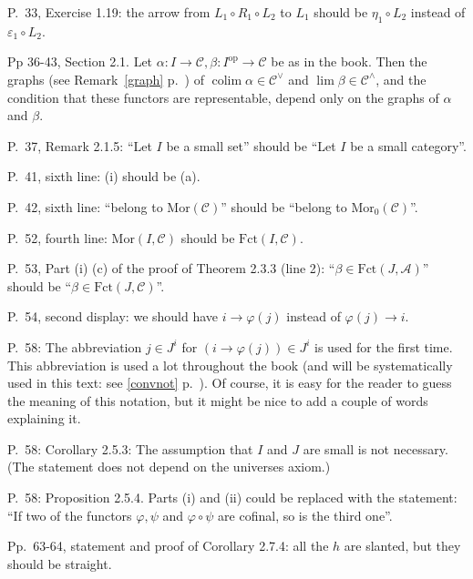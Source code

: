 \documentclass[12pt]{article}
\theoremstyle{remark}%
\newcommand{\n}{\noindent}
\newcommand{\A}{\mathcal A}
\newcommand{\C}{\mathcal C}
\DeclareMathOperator*{\coli}{colim}
\DeclareMathOperator{\h}{Hom}
\DeclareMathOperator{\op}{op}
\begin{document}
\n P.~33, Exercise 1.19: the arrow from $L_1\circ R_1\circ L_2$ to $L_1$ should be $\eta_1\circ L_2$ instead of $\varepsilon_1\circ L_2$. 

\n Pp 36-43, Section 2.1. Let $\alpha:I\to\C,\beta:I^{\op}\to\C$ be as in the book. Then the graphs (see Remark~\ref{graph} p.~\pageref{graph}) of $\coli\alpha\in\C^\vee$ and $\lim\beta\in\C^\wedge$, and the condition that these functors are representable, depend only on the graphs of $\alpha$ and $\beta$. 

\n P.~37, Remark 2.1.5: ``Let $I$ be a small set'' should be ``Let $I$ be a small category''.  

\n P.~41, sixth line: (i) should be (a). 

\n P.~42, sixth line: ``belong to $\text{Mor}(\C)$'' should be ``belong to $\text{Mor}_0(\C)$''.

\n P.~52, fourth line: $\text{Mor}(I,\C)$ should be $\text{Fct}(I,\C)$. 

\n P.~53, Part (i) (c) of the proof of Theorem 2.3.3 (line 2): ``$\beta\in\text{Fct}(J,\A)$'' should be ``$\beta\in\text{Fct}(J,\C)$''.

\n P.~54, second display: we should have $i\to\varphi(j)$ instead of $\varphi(j)\to i$. 


\n P.~58: The abbreviation $j\in J^i$ for $(i\to\varphi(j))\in J^i$ is used for the first time. This abbreviation is used a lot throughout the book (and will be systematically used in this text: see \eqref{convnot} p.~\pageref{convnot}). Of course, it is easy for the reader to guess the meaning of this notation, but it might be nice to add a couple of words explaining it. 

\n P.~58: Corollary 2.5.3: The assumption that $I$ and $J$ are small is not necessary. (The statement does not depend on the universes axiom.) 

\n P.~58: Proposition 2.5.4. Parts (i) and (ii) could be replaced with the statement: ``If two of the functors $\varphi,\psi$ and $\varphi\circ\psi$ are cofinal, so is the third one''.

\n Pp.~63-64, statement and proof of Corollary 2.7.4: all the $h$ are slanted, but they should be straight.
\end{document}
